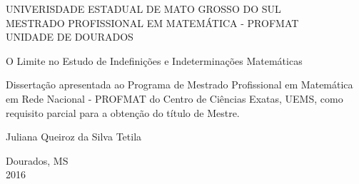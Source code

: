 \thispagestyle{empty}
\begin{center}

\normalsize{UNIVERISDADE ESTADUAL DE MATO GROSSO DO SUL\\ MESTRADO PROFISSIONAL EM MATEMÁTICA - PROFMAT\\UNIDADE DE DOURADOS}

\vspace*{4cm}
\Large{O Limite no Estudo de Indefinições e Indeterminações Matemáticas}


\vspace*{4cm}

\end{center}
\begin{flushright}
\begin{minipage}{0.5\textwidth}
\normalsize{
Dissertação apresentada ao Programa de Mestrado
Profissional em Matemática em Rede Nacional
- PROFMAT do Centro de Ciências Exatas,
UEMS, como requisito parcial para a obtenção do
título de Mestre.

\vspace*{2cm}

Juliana Queiroz da Silva Tetila


}
\end{minipage}
\end{flushright}
\vspace*{4cm}
\begin{center}
Dourados, MS\\
 2016
\end{center}



